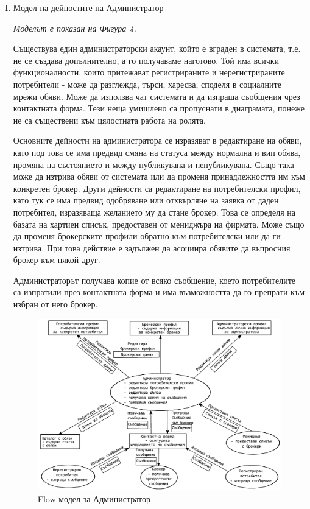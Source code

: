 \documentclass[]{article}
\begin{document}
\begin{enumerate}[I.]
	\item {Модел на дейностите на Администратор

\emph{Моделът е показан на Фигура 4.} 

Съществува един администраторски акаунт, който е вграден в системата, т.е. не се създава допълнително, а го получаваме наготово. Той има всички функционалности, които притежават регистрираните и нерегистрираните потребители - може да разглежда, търси, харесва, споделя в социалните мрежи обяви. Може да използва чат системата и да изпраща съобщения чрез контактната форма. Тези неща умишлено са пропуснати в диаграмата, понеже не са съществени към цялостната работа на ролята.

Основните дейности на администратора се изразяват в редактиране на обяви, като под това се има предвид смяна на статуса между нормална и вип обява, промяна на състоянието и между публикувана и непубликувана. Също така може да изтрива обяви от системата или да променя принадлежността им към конкретен брокер. Други дейности са редактиране на потребителски профил, като тук се има предвид одобряване или отхвърляне на заявка от даден потребител, изразяваща желанието му да стане брокер. Това се определя на базата на хартиен списък, предоставен от мениджъра на фирмата. Може също да променя брокерските профили обратно към потребителски или да ги изтрива. При това действие е задължен да асоциира обявите да въпросния брокер към някой друг.

Администраторът получава копие от всяко съобщение, което потребителите са изпратили през контактната форма и има възможността да го препрати към избран от него брокер.

	\begin{figure}[h]
	\centering
	\includegraphics[scale=0.85]{flow-administrator}
	\caption{Flow модел за Администратор}
	\end{figure}
	
}
\end{enumerate}
\end{document}
